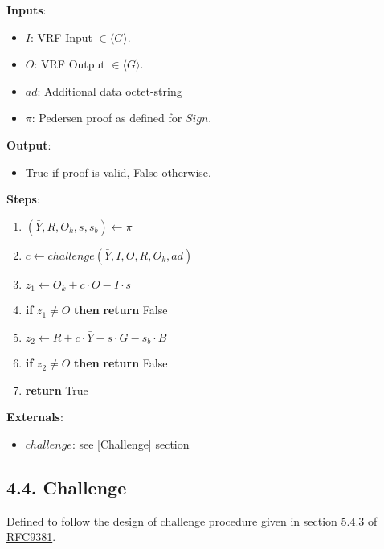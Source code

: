 \documentclass[
]{article}
\providecommand{\tightlist}{%
  \setlength{\itemsep}{0pt}\setlength{\parskip}{0pt}}
\begin{document}
\textbf{Inputs}:

\begin{itemize}
\tightlist
\item
  \(I\): VRF Input \(\in \langle G \rangle\).
\item
  \(O\): VRF Output \(\in \langle G \rangle\).
\item
  \(ad\): Additional data octet-string
\item
  \(\pi\): Pedersen proof as defined for \(Sign\).
\end{itemize}

\textbf{Output}:

\begin{itemize}
\tightlist
\item
  True if proof is valid, False otherwise.
\end{itemize}

\textbf{Steps}:

\begin{enumerate}
\def\labelenumi{\arabic{enumi}.}
\tightlist
\item
  \((\bar{Y}, R, O_k, s, s_b) \leftarrow \pi\)
\item
  \(c \leftarrow challenge(\bar{Y}, I, O, R, O_k, ad)\)
\item
  \(z_1 \leftarrow O_k + c \cdot O - I \cdot s\)
\item
  \textbf{if} \(z_1 \neq O\) \textbf{then} \textbf{return} False
\item
  \(z_2 \leftarrow R + c \cdot \bar{Y} - s \cdot G - s_b \cdot B\)
\item
  \textbf{if} \(z_2 \neq O\) \textbf{then} \textbf{return} False
\item
  \textbf{return} True
\end{enumerate}

\textbf{Externals}:

\begin{itemize}
\tightlist
\item
  \(challenge\): see {[}Challenge{]} section
\end{itemize}

\hypertarget{challenge}{%
\subsection{4.4. Challenge}\label{challenge}}

Defined to follow the design of challenge procedure given in section
5.4.3 of \href{https://datatracker.ietf.org/doc/rfc9381}{RFC9381}.
\end{document}
